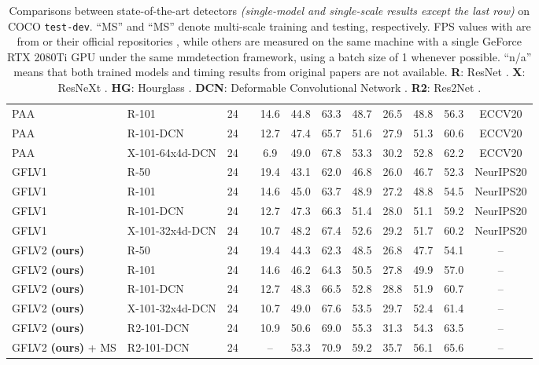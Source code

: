 \documentclass[10pt,twocolumn,letterpaper]{article}
\begin{document}
\begin{table*}[t]
\begin{threeparttable}
{\begin{tabular}{l|l|c|c|c|ccc|ccc|c}
				PAA \cite{kim2020probabilistic} & R-101 & 24 &  & 14.6 & 44.8 & 63.3 & 48.7 & 26.5 & 48.8 & 56.3 & ECCV20\\
				PAA \cite{kim2020probabilistic} & R-101-DCN & 24 &  & 12.7 & 47.4 & 65.7 & 51.6 & 27.9 & 51.3 & 60.6 & ECCV20\\
				PAA \cite{kim2020probabilistic} & X-101-64x4d-DCN & 24 &  & 6.9 & 49.0 & 67.8 & 53.3 & 30.2 & 52.8 & 62.2 & ECCV20\\
				GFLV1 \cite{li2020generalized} &R-50 & 24 &  & 19.4 & 43.1 & 62.0 & 46.8 & 26.0 & 46.7 & 52.3 & NeurIPS20\\
				GFLV1 \cite{li2020generalized}&R-101 & 24 &  & 14.6 & 45.0 & 63.7 & 48.9 & 27.2 & 48.8 & 54.5 & NeurIPS20 \\
GFLV1 \cite{li2020generalized}&R-101-DCN & 24 &  & 12.7 & 47.3 & 66.3 & 51.4 & 28.0 & {51.1} & 59.2& NeurIPS20 \\
				GFLV1 \cite{li2020generalized}&X-101-32x4d-DCN & 24 &   & 10.7 & {48.2} & {67.4} & {52.6} & {29.2} & {51.7} & {60.2}& NeurIPS20 \\
				\hline
				GFLV2 \textbf{(ours)}&R-50 & 24 &  & 19.4 & 44.3 & 62.3 & 48.5 &  26.8 & 47.7 & 54.1 & -- \\
				GFLV2 \textbf{(ours)}&R-101 & 24 &  & 14.6 & 46.2 & 64.3 & 50.5 & 27.8 & 49.9 & 57.0 & -- \\
GFLV2 \textbf{(ours)}&R-101-DCN & 24 &  & 12.7 & 48.3 & 66.5 & 52.8 & 28.8 & 51.9 & 60.7 & -- \\
				GFLV2 \textbf{(ours)}&X-101-32x4d-DCN & 24 &   & 10.7 & 49.0 & 67.6 & 53.5 & 29.7 & 52.4 & 61.4 & -- \\
				GFLV2 \textbf{(ours)}&R2-101-DCN & 24 &   & 10.9 & 50.6 & 69.0 & 55.3 & 31.3 & 54.3 & 63.5 & -- \\
				GFLV2 \textbf{(ours)} + MS &R2-101-DCN & 24 &   & -- & 53.3 & 70.9 & 59.2 & 35.7 & 56.1 & 65.6 & -- \\
				\hline
			\end{tabular}
		}
	\end{threeparttable}
	\vspace{-8pt}
	\caption{Comparisons between state-of-the-art detectors \emph{(single-model and single-scale results except the last row)} on COCO {\tt test-dev}. ``MS'' and ``MS'' denote multi-scale training and testing, respectively. FPS values with  are from \cite{zhu2019soft} or their official repositories \cite{qiu2020borderdet}, while others are measured on the same machine with a single GeForce RTX 2080Ti GPU under the same mmdetection \cite{chen2019mmdetection} framework, using a batch size of 1 whenever possible. ``n/a'' means that both trained models and timing results from original papers are not available. \textbf{R}: ResNet \cite{he2016deep}. \textbf{X}: ResNeXt \cite{xie2017aggregated}. \textbf{HG}: Hourglass \cite{newell2016stacked}. \textbf{DCN}: Deformable Convolutional Network \cite{zhu2019deformable}. \textbf{R2}: Res2Net \cite{gao2019res2net}.}
	\vspace{-6pt}
	\label{tab_sota}
\end{table*}
\end{document}
